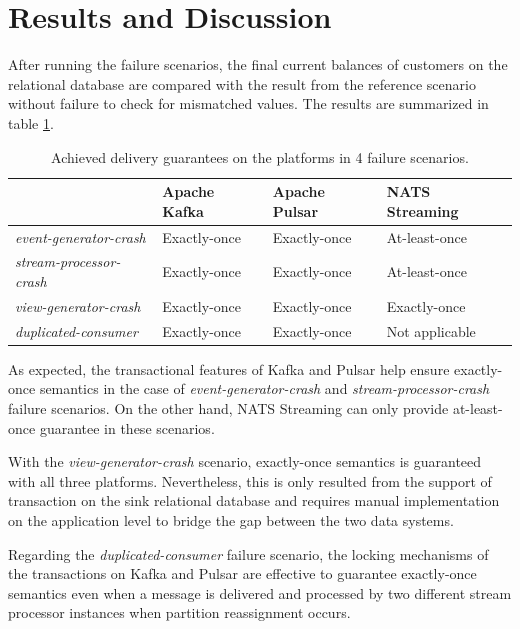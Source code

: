 \section{Results and Discussion}
After running the failure scenarios, the final current balances of customers on the relational database are compared with the result from the reference scenario without failure to check for mismatched values. The results are summarized in table \ref{fig:failurescenariosresult}.
\begin{table}[h]
	\centering
	\begin{tabular}{|l|l|l|l|}
		\hline
		& Apache Kafka & Apache Pulsar & NATS Streaming \\ \hline
		\textit{event-generator-crash}  & Exactly-once & Exactly-once  & At-least-once  \\ \hline
		\textit{stream-processor-crash} & Exactly-once & Exactly-once  & At-least-once  \\ \hline
		\textit{view-generator-crash}   & Exactly-once & Exactly-once  & Exactly-once   \\ \hline
		\textit{duplicated-consumer}    & Exactly-once & Exactly-once  & Not applicable \\ \hline
	\end{tabular}
	\caption{Achieved delivery guarantees on the platforms in 4 failure scenarios.}
	\label{fig:failurescenariosresult}
\end{table}

As expected, the transactional features of Kafka and Pulsar help ensure exactly-once semantics in the case of \emph{event-generator-crash} and \emph{stream-processor-crash} failure scenarios. On the other hand, NATS Streaming can only provide at-least-once guarantee in these scenarios.  

With the \emph{view-generator-crash} scenario, exactly-once semantics is guaranteed with all three platforms. Nevertheless, this is only resulted from the support of transaction on the sink relational database and requires manual implementation on the application level to bridge the gap between the two data systems. 

Regarding the \emph{duplicated-consumer} failure scenario, the locking mechanisms of the transactions on Kafka and Pulsar are effective to guarantee exactly-once semantics even when a message is delivered and processed by two different stream processor instances when partition reassignment occurs. 

